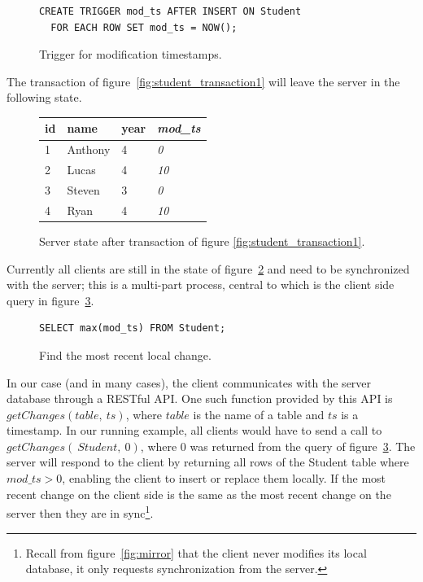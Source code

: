 \documentclass[journal]{IEEEtran}
\begin{document}
\begin{figure}[h!]
\begin{lstlisting}
CREATE TRIGGER mod_ts AFTER INSERT ON Student
  FOR EACH ROW SET mod_ts = NOW();
\end{lstlisting}
\caption{Trigger for modification timestamps.}
\label{fig:student_trigger}
\end{figure}

The transaction of figure~\ref{fig:student_transaction1} will leave the server in the following state.

\begin{figure}[h!]
\center
\begin{tabular}{ l | l | l || l }
id  & name      & year  & \textit{mod\_ts} \\
\hline  \hline
1   & Anthony   & 4     & \textit{0}        \\
2   & Lucas     & 4     & \textit{10}        \\
3   & Steven    & 3     & \textit{0}        \\
4   & Ryan      & 4     & \textit{10}        \\
\end{tabular}
\caption{Server state after transaction of figure \ref{fig:student_transaction1}.}
\label{fig:student_update}
\end{figure}

Currently all clients are still in the state of figure~\ref{fig:student_update} and need to be synchronized with the server; this is a multi-part process, central to which is the client side query in figure~\ref{fig:student_change}. 

\begin{figure}[h!]
\begin{lstlisting}
SELECT max(mod_ts) FROM Student;
\end{lstlisting}
\caption{Find the most recent local change.}
\label{fig:student_change}
\end{figure}

In our case (and in many cases), the client communicates with the server database through a RESTful API. One such function provided by this API is $getChanges(table,~ts)$, where $table$ is the name of a table and $ts$ is a timestamp. In our running example, all clients would have to send a call to $getChanges(~Student,~0)$, where $0$ was returned from the query of figure~\ref{fig:student_change}. The server will respond to the client by returning all rows of the Student table where $mod\_ts > 0$, enabling the client to insert or replace them locally. If the most recent change on the client side is the same as the most recent change on the server then they are in sync\footnote{Recall from figure~\ref{fig:mirror} that the client never modifies its local database, it only requests synchronization from the server.}.
\end{document}

